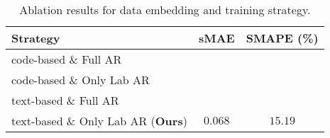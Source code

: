\begin{table}[htbp]
    \centering
    \begin{tabular}{lcc}
        \toprule
        Strategy & sMAE & SMAPE (\%) \\
        \midrule
        code-based \& Full AR \\
        code-based \& Only Lab AR \\
        text-based \& Full AR \\
        \midrule
        text-based \& Only Lab AR (\textbf{Ours}) & $\bm{0.068}$ & $\bm{15.19}$ \\
        \bottomrule
    \end{tabular}
    \caption{
        Ablation results for data embedding and training strategy.
    }
    \label{tab:abl_embed}
\end{table}